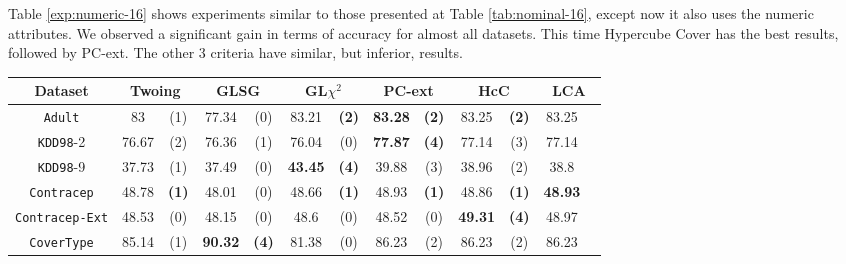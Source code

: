 Table \ref{exp:numeric-16} shows experiments  similar to those presented at Table \ref{tab:nominal-16}, except now it also uses the numeric attributes. We observed a significant gain in terms of accuracy for almost all datasets. This time Hypercube Cover has the best results, followed by PC-ext. The other 3 criteria have similar, but inferior, results.

\begin{table}
\small
\centering
\begin{tabular}{c|cc|cc|cc|cc|cc|cc} 
Dataset              &        \multicolumn{2}{c|}{Twoing} &   \multicolumn{2}{c|}{GLSG} &   \multicolumn{2}{c|}{GL$\chi^2$} & \multicolumn{2}{c|}{PC-ext}  & \multicolumn{2}{c|}{HcC}  & \multicolumn{2}{c}{LCA}  \\
\hline   
{\tt Adult}          &  83            &  (1)              &  77.34      &  (0)          &  83.21       &  {\bf (2)}         & {\bf 83.28} & {\bf (2)}      & 83.25        & {\bf (2)} & 83.25        &           \\
{\tt KDD98}-2        &  76.67         &  (2)              &  76.36      &  (1)          &  76.04       &  (0)               & {\bf 77.87} & {\bf (4)}      & 77.14        & (3)       & 77.14        &           \\
{\tt KDD98}-9        &  37.73         &  (1)              &  37.49      &  (0)          &  {\bf 43.45} &  {\bf (4)}         &  39.88      & (3)            & 38.96        & (2)       & 38.8         &           \\
{\tt Contracep}      &  48.78         &  {\bf (1)}        &  48.01      &  (0)          &  48.66       &  {\bf (1)}         &  48.93      & {\bf (1)}      & 48.86        & {\bf (1)} & {\bf 48.93}  &           \\
{\tt Contracep-Ext}  &  48.53         &  (0)              &  48.15      &  (0)          &  48.6        &  (0)               &  48.52      & (0)            & {\bf 49.31 } & {\bf (4)} & 48.97        &           \\
{\tt CoverType}      &  85.14         &  (1)              &  {\bf 90.32}&  {\bf (4)}    &  81.38       &  (0)               &  86.23      & (2)            & 86.23        & (2)       & 86.23        &           \\

\end{tabular}
\end{table}
